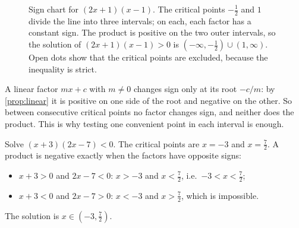 \begin{figure}[ht]
\centering
{}
\caption{Sign chart for $(2x+1)(x-1)$. The critical points $-\tfrac12$ and $1$ divide the line into three
intervals; on each, each factor has a constant sign. The product is positive on the two outer intervals, so
the solution of $(2x+1)(x-1)>0$ is $(-\infty,-\tfrac12)\cup(1,\infty)$. Open dots show that the critical points
are excluded, because the inequality is strict.}
\label{fig:sign-chart}
\end{figure}

\begin{external}
A linear factor $mx+c$ with $m\ne0$ changes sign only at its root $-c/m$: by \cref{prop:linear} it is positive on
one side of the root and negative on the other. So between consecutive critical points no factor changes sign,
and neither does the product. This is why testing one convenient point in each interval is enough.
\end{external}

\begin{example}
Solve $(x+3)(2x-7)<0$.
\solution
The critical points are $x=-3$ and $x=\tfrac72$. A product is negative exactly when the factors have opposite
signs:
\begin{itemize}
  \item $x+3>0$ and $2x-7<0$: $x>-3$ and $x<\tfrac72$, i.e.\ $-3<x<\tfrac72$;
  \item $x+3<0$ and $2x-7>0$: $x<-3$ and $x>\tfrac72$, which is impossible.
\end{itemize}
The solution is $x\in(-3,\tfrac72)$.
\end{example}

